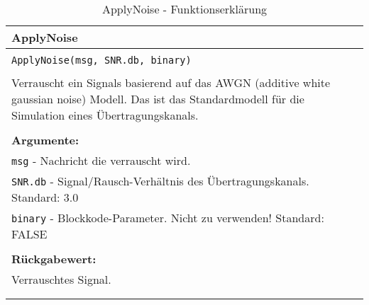 \begin{longtable}{|p{\textwidth}|}
\hline
\rowcolor{lightblue}
ApplyNoise\\
\hline
\\
\texttt{ApplyNoise(msg, SNR.db, binary)}\\
\\
Verrauscht ein Signals basierend auf das AWGN (additive white gaussian noise) Modell. Das ist das Standardmodell für die Simulation eines Übertragungskanals.\\
\\
\textbf{Argumente:}\\
\texttt{msg} - Nachricht die verrauscht wird.\\
\texttt{SNR.db} - Signal/Rausch-Verhältnis des Übertragungskanals. Standard: 3.0\\
\texttt{binary} - Blockkode-Parameter. Nicht zu verwenden! Standard: FALSE\\
\\
\textbf{Rückgabewert:}\\
Verrauschtes Signal.\\
\\
\hline
\caption{ApplyNoise - Funktionserklärung}
\end{longtable}